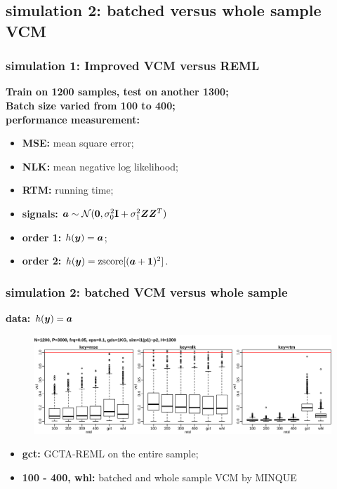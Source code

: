 \documentclass{beamer}
\begin{document}
\subsection{simulation 2: batched versus whole sample VCM}
\begin{frame}\frametitle{simulation 1: Improved VCM versus REML}
  \textbf{Train on 1200 samples, test on another 1300;} \\
  \textbf{Batch size varied from 100 to 400;} \\
  {\color{blue}\textbf{performance measurement:}}
  \begin{itemize}
  \item \textbf{MSE:} mean square error;
  \item \textbf{NLK:} mean negative log likelihood;
  \item \textbf{RTM:} running time;
  \end{itemize}
  \begin{itemize}
  \item \textbf{signals:} ${\bm{a}} \sim \mathcal{N}(\bm{0}, \sigma_0^2\textbf{I} + \sigma_1^2{\bm{Z}}{\bm{Z}}^T)$
  \item \textbf{order 1:} $h({\bm{y}})={\bm{a}}$;
  \item \textbf{order 2:} $h({\bm{y}})=\text{zscore}[({\bm{a}} + \mathbf{1})^2]$.
  \end{itemize}
\end{frame}
\begin{frame}\frametitle{simulation 2: batched VCM versus whole sample}
  \textbf{data: $h({\bm{y}})={\bm{a}}$} \\
  \begin{figure}
    \centering \includegraphics[width=1\linewidth]{img/1kg_bat_p01}
  \end{figure}
  \textbf{\color{blue}{inner plot: strategies, from left to right:}}
  \begin{itemize}
  \item \textbf{gct:} GCTA-REML on the entire sample;
  \item \textbf{100 - 400, whl:} batched and whole sample VCM by MINQUE
  \end{itemize}
\end{frame}
\end{document}
